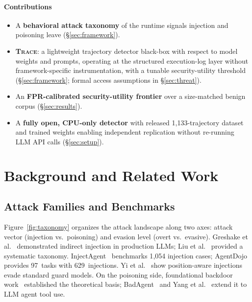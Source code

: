 \documentclass[conference]{IEEEtran}
\begin{document}
\paragraph{Contributions}
\begin{itemize}[leftmargin=*,topsep=2pt,itemsep=1pt]
  \item A \textbf{behavioral attack taxonomy} of the runtime signals
    injection and poisoning leave (\S\ref{sec:framework}).
  \item \textbf{\textsc{Trace}}: a lightweight trajectory detector
    black-box with respect to model weights and prompts, operating at
    the structured execution-log layer without framework-specific
    instrumentation, with a tunable security-utility threshold
    (\S\ref{sec:framework}; formal access assumptions in \S\ref{sec:threat}).
  \item An \textbf{FPR-calibrated security-utility frontier} over a
    size-matched benign corpus (\S\ref{sec:results}).
  \item A \textbf{fully open, CPU-only detector} with released
    1{,}133-trajectory dataset and trained weights enabling independent
    replication without re-running LLM API calls (\S\ref{sec:setup}).
\end{itemize}

\section{Background and Related Work}
\label{sec:background}

\subsection{Attack Families and Benchmarks}

Figure~\ref{fig:taxonomy} organizes the attack landscape along two
axes: attack vector (injection vs.\ poisoning) and evasion level
(overt vs.\ evasive).  Greshake et al.~\cite{greshake2023not}
demonstrated indirect injection in production LLMs;
Liu et al.~\cite{liu2023prompt} provided a systematic taxonomy.
InjectAgent~\cite{zhan2024injectagent} benchmarks 1{,}054 injection
cases; AgentDojo~\cite{debenedetti2024agentdojo} provides 97~tasks
with 629~injections.  Yi et al.~\cite{yi2023benchmarking} show
position-aware injections evade standard guard models.  On the
poisoning side, foundational backdoor work~\cite{gu2019badnets,
li2022backdoor} established the theoretical basis; BadAgent~\cite{shi2024badagent}
and Yang et al.~\cite{yang2024watch} extend it to LLM agent tool use.
\end{document}
